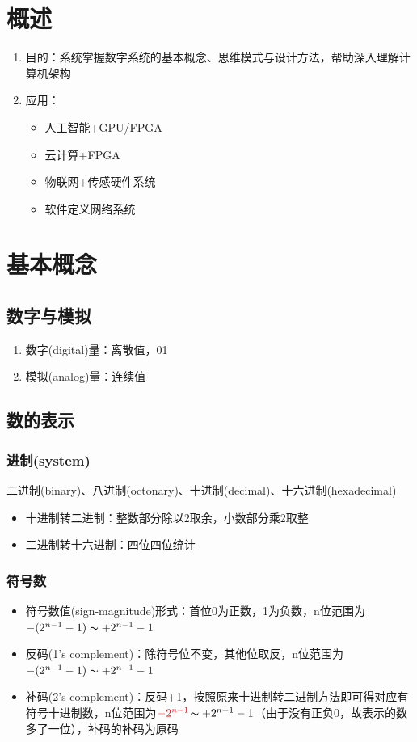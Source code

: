 \section{概述}
\begin{enumerate}
	\item 目的：系统掌握数字系统的基本概念、思维模式与设计方法，帮助深入理解计算机架构
	\item 应用：
	\begin{itemize}
		\item 人工智能+GPU/FPGA
		\item 云计算+FPGA
		\item 物联网+传感硬件系统
		\item 软件定义网络系统
	\end{itemize}
\end{enumerate}


\section{基本概念}
\subsection{数字与模拟}
\begin{enumerate}
	\item 数字(digital)量：离散值，01
	\item 模拟(analog)量：连续值
\end{enumerate}

\subsection{数的表示}
\subsubsection{进制(system)}
二进制(binary)、八进制(octonary)、十进制(decimal)、十六进制(hexadecimal)
\begin{itemize}
	\item 十进制转二进制：整数部分除以2取余，小数部分乘2取整
	\item 二进制转十六进制：四位四位统计
\end{itemize}
\subsubsection{符号数}
\begin{itemize}
	\item 符号数值(sign-magnitude)形式：首位0为正数，1为负数，n位范围为$-(2^{n-1}-1)\thicksim +2^{n-1}-1$
	\item 反码(1's complement)：除符号位不变，其他位取反，n位范围为$-(2^{n-1}-1)\thicksim +2^{n-1}-1$
	\item 补码(2's complement)：反码+1，按照原来十进制转二进制方法即可得对应有符号十进制数，n位范围为$\color{red}{-2^{n-1}}$$\thicksim +2^{n-1}-1$（由于没有正负0，故表示的数多了一位），补码的补码为原码
\end{itemize}
